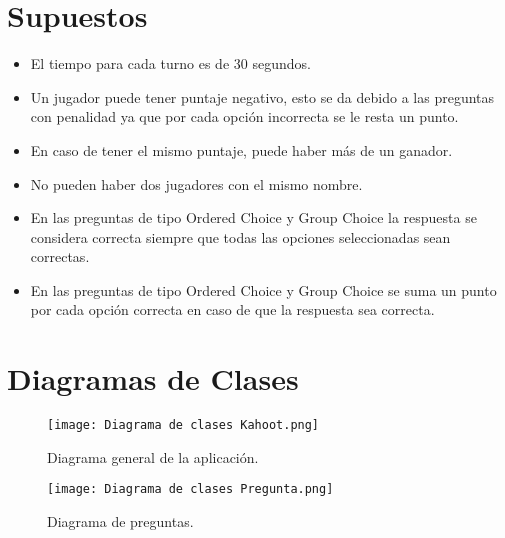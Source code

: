 \documentclass[titlepage,a4paper]{article}
\begin{document}
\section{Supuestos}\label{sec:supuestos}
\begin{itemize}
    \item El tiempo para cada turno es de 30 segundos.
\end{itemize}
\begin{itemize}
    \item Un jugador puede tener puntaje negativo, esto se da debido a las preguntas con penalidad ya que por cada opción incorrecta se le resta un punto.
\end{itemize}
\begin{itemize}
    \item En caso de tener el mismo puntaje, puede haber más de un ganador.
\end{itemize}
\begin{itemize}
    \item No pueden haber dos jugadores con el mismo nombre.
\end{itemize}
\begin{itemize}
    \item En las preguntas de tipo Ordered Choice y Group Choice la respuesta se considera correcta siempre que todas las opciones seleccionadas sean correctas.
\end{itemize}
\begin{itemize}
    \item En las preguntas de tipo Ordered Choice y Group Choice se suma un punto por cada opción correcta en caso de que la respuesta sea correcta.
\end{itemize}


\section{Diagramas de Clases}\label{sec:diagramasdeclases}

\begin{figure}[H]
\centering
\texttt{[image: Diagrama de clases Kahoot.png]}
\caption{\label{fig:seq01}Diagrama general de la aplicación.}
\end{figure}

\begin{figure}[H]
\centering
\texttt{[image: Diagrama de clases Pregunta.png]}
\caption{\label{fig:seq01}Diagrama de preguntas.}
\end{figure}
\end{document}

